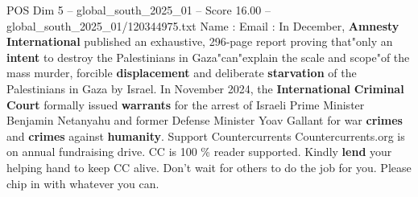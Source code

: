 \begin{textsample}{POS Dim 5 – global\_south\_2025\_01 – Score 16.00 – global\_south\_2025\_01/120344975.txt}
Name : Email : In December, \textbf{Amnesty} \textbf{International} published an exhaustive, 296-page report proving that"only an \textbf{intent} to destroy the Palestinians in Gaza"can"explain the scale and scope"of the mass murder, forcible \textbf{displacement} and deliberate \textbf{starvation} of the Palestinians in Gaza by Israel.
In November 2024, the \textbf{International} \textbf{Criminal} \textbf{Court} formally issued \textbf{warrants} for the arrest of Israeli Prime Minister Benjamin Netanyahu and former Defense Minister Yoav Gallant for war \textbf{crimes} and \textbf{crimes} against \textbf{humanity}.
Support Countercurrents Countercurrents.org is on annual fundraising drive.
CC is 100 \% reader supported.
Kindly \textbf{lend} your helping hand to keep CC alive.
Don't wait for others to do the job for you.
Please chip in with whatever you can.

\end{textsample}
